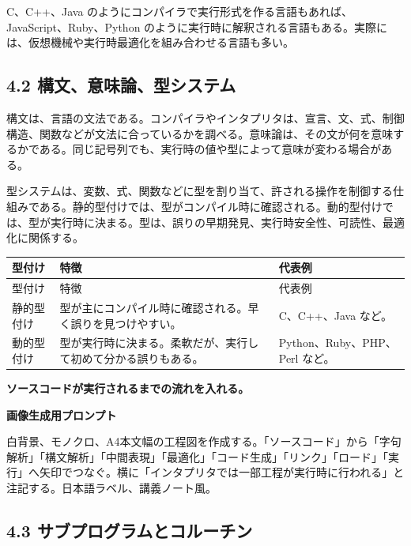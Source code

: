 \documentclass[a4paper,11pt]{ltjsarticle}
\begin{document}
C、C++、Java のようにコンパイラで実行形式を作る言語もあれば、JavaScript、Ruby、Python のように実行時に解釈される言語もある。実際には、仮想機械や実行時最適化を組み合わせる言語も多い。

\subsection{4.2 構文、意味論、型システム}

構文は、言語の文法である。コンパイラやインタプリタは、宣言、文、式、制御構造、関数などが文法に合っているかを調べる。意味論は、その文が何を意味するかである。同じ記号列でも、実行時の値や型によって意味が変わる場合がある。

型システムは、変数、式、関数などに型を割り当て、許される操作を制御する仕組みである。静的型付けでは、型がコンパイル時に確認される。動的型付けでは、型が実行時に決まる。型は、誤りの早期発見、実行時安全性、可読性、最適化に関係する。

\begin{longtable}{>{\raggedright\arraybackslash}p{}>{\raggedright\arraybackslash}p{}>{\raggedright\arraybackslash}p{}}
\toprule
型付け & 特徴 & 代表例 \\
\midrule
\endfirsthead
\toprule
型付け & 特徴 & 代表例 \\
\midrule
\endhead
静的型付け & 型が主にコンパイル時に確認される。早く誤りを見つけやすい。 & C、C++、Java など。 \\
動的型付け & 型が実行時に決まる。柔軟だが、実行して初めて分かる誤りもある。 & Python、Ruby、PHP、Perl など。 \\
\bottomrule
\end{longtable}

\begin{todobox}
\textbf{ソースコードが実行されるまでの流れを入れる。}\par
\textbf{画像生成用プロンプト}\par
白背景、モノクロ、A4本文幅の工程図を作成する。「ソースコード」から「字句解析」「構文解析」「中間表現」「最適化」「コード生成」「リンク」「ロード」「実行」へ矢印でつなぐ。横に「インタプリタでは一部工程が実行時に行われる」と注記する。日本語ラベル、講義ノート風。

\end{todobox}

\subsection{4.3 サブプログラムとコルーチン}
\end{document}
